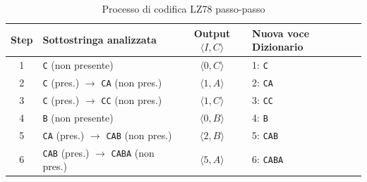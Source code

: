 \begin{table}[htbp]
\centering
\begin{tabular}{|c|l|c|l|}
\hline
\textbf{Step} & \textbf{Sottostringa analizzata} & \textbf{Output $\langle I, C \rangle$} & \textbf{Nuova voce Dizionario} \\
\hline
1 & \texttt{C} (non presente) & $\langle 0, C \rangle$ & 1: \texttt{C} \\
2 & \texttt{C} (pres.) $\to$ \texttt{CA} (non pres.) & $\langle 1, A \rangle$ & 2: \texttt{CA} \\
3 & \texttt{C} (pres.) $\to$ \texttt{CC} (non pres.) & $\langle 1, C \rangle$ & 3: \texttt{CC} \\
4 & \texttt{B} (non presente) & $\langle 0, B \rangle$ & 4: \texttt{B} \\
5 & \texttt{CA} (pres.) $\to$ \texttt{CAB} (non pres.) & $\langle 2, B \rangle$ & 5: \texttt{CAB} \\
6 & \texttt{CAB} (pres.) $\to$ \texttt{CABA} (non pres.)& $\langle 5, A \rangle$ & 6: \texttt{CABA} \\
\hline
\end{tabular}
\caption{Processo di codifica LZ78 passo-passo}
\end{table}